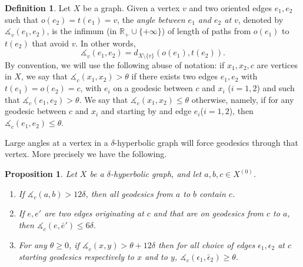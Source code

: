 \documentclass[11pt]{article}
\newtheorem{prop}[theo]{Proposition}
\theoremstyle{definition}
\newtheorem{defi}[theo]{Definition}
\numberwithin{equation}{section}
\newcommand{\A}{\measuredangle}
\begin{document}
\begin{defi}
Let $X$ be a graph. Given a vertex $v$ and two oriented edges $e_1, e_2$ such that $o(e_2) = t(e_1) =v$, the \emph{angle between $e_1$ and $e_2$ at $v$}, denoted by $\A_v(e_1,e_2)$, is the infimum (in $\mathbb{R_+} \cup \{+\infty\}$) of length of paths from $o(e_1)$ to $t(e_2) $ that avoid $v$. In other words,
\[
\A_v(e_1,e_2)=d_{X\setminus\{v\}}(o(e_1),t(e_2)).
\]
By convention, we will use the following abuse of notation: if $x_1, x_2,c$ are vertices in $X$, we say that $\A_c(x_1,x_2)>\theta$ if there exists two edges $e_1, e_2$ with $t(e_1)= o(e_2) =c$, with $e_i$ on a geodesic between $c$ and $x_i$ ($i=1,2$) and such that $\A_c(e_1,e_2)>\theta$. We say that $\A_c(x_1,x_2)\leq\theta$ otherwise, namely, if for any geodesic between $c$ and $x_i$ and starting by and edge $e_i$($i=1,2$), then $\A_c(e_1,e_2)\leq\theta$.
\end{defi}

Large angles at a vertex in a $\delta$-hyperbolic graph will force geodesics through that vertex. More precisely we have the following.

\begin{prop}\label{prop;goulet}
Let $X$ be a $\delta$-hyperbolic graph, and let $a,b,c\in X^{(0)}$.
\begin{enumerate}
\item \label{1.2.1} If $\A_c{(a,b)} >12\delta$, then all geodesics from $a$ to $b$ contain $c$.
\item \label{1.2.2} If $e,e'$ are two edges originating at $c$ and that are on geodesics from $c$ to $a$, then $\A_c(e, \bar e') \leq 6\delta$.
\item \label{1.2.3} For any $\theta\geq 0$, if $\A_c(x,y) > \theta + 12\delta$ then for all choice of edges $\epsilon_1, \epsilon_2$ at $c$ starting geodesics respectively to $x$ and to $y$, $\A_c(\epsilon_1, \bar \epsilon_2) \geq \theta$.
\end{enumerate}
\end{prop}
\end{document}
